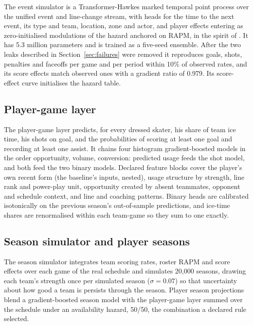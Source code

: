 The event simulator is a Transformer-Hawkes marked temporal point process
\citep{zuo2020transformer} over the unified event and line-change stream, with
heads for the time to the next event, its type and team, location, zone and
actor, and player effects entering as zero-initialised modulations of the
hazard anchored on RAPM, in the spirit of \citet{thomas2013competing}. It has
5.3 million parameters and is trained as a five-seed ensemble. After the two
leaks described in Section~\ref{sec:failures} were removed it reproduces goals,
shots, penalties and faceoffs per game and per period within 10\% of observed
rates, and its score effects match observed ones with a gradient ratio of
0.979. Its score-effect curve initialises the \neurhlG{} hazard table.

\subsection{Player-game layer}
\label{sec:m-pg}

The player-game layer predicts, for every dressed skater, his share of team
ice time, his shots on goal, and the probabilities of scoring at least one goal
and recording at least one assist. It chains four histogram gradient-boosted
models in the order opportunity, volume, conversion: predicted usage feeds the
shot model, and both feed the two binary models. Declared feature blocks cover
the player's own recent form (the baseline's inputs, nested), usage structure
by strength, line rank and power-play unit, opportunity created by absent
teammates, opponent and schedule context, and line and coaching patterns.
Binary heads are calibrated isotonically on the previous season's
out-of-sample predictions, and ice-time shares are renormalised within each
team-game so they sum to one exactly.

\subsection{Season simulator and player seasons}
\label{sec:m-season}

The season simulator integrates team scoring rates, roster RAPM and score
effects over each game of the real schedule and simulates 20,000 seasons,
drawing each team's strength once per simulated season ($\sigma = 0.07$) so that
uncertainty about how good a team is persists through the season. Player
season projections blend a gradient-boosted season model with the
player-game layer summed over the schedule under an availability hazard,
50/50, the combination a declared rule selected.

